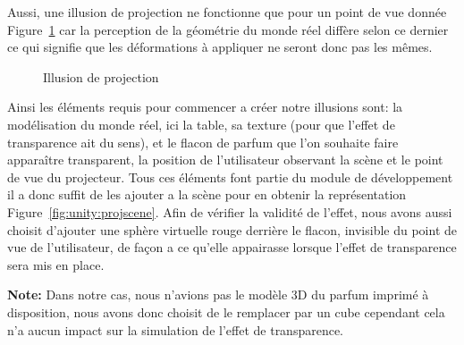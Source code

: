 Aussi, une illusion de projection ne fonctionne que pour un point de vue donnée Figure~\ref{fig:projpov} car la perception de la géométrie du monde réel diffère selon ce dernier ce qui signifie que les déformations à appliquer ne seront donc pas les mêmes.

\begin{figure}[H]
\centering
\caption{Illusion de projection}
\label{fig:projpov}
\end{figure}

Ainsi les éléments requis pour commencer a créer notre illusions sont: la modélisation du monde réel, ici la table, sa texture (pour que l'effet de transparence ait du sens), et le flacon de parfum que l'on souhaite faire apparaître transparent, la position de l'utilisateur observant la scène et le point de vue du projecteur. Tous ces éléments font partie du module de développement il a donc suffit de les ajouter a la scène pour en obtenir la représentation Figure~\ref{fig:unity:projscene}.
Afin de vérifier la validité de l'effet, nous avons aussi choisit d'ajouter une sphère virtuelle rouge derrière le flacon, invisible du point de vue de l'utilisateur, de façon a ce qu'elle appairasse lorsque l'effet de transparence sera mis en place.

\textbf{Note:} Dans notre cas, nous n'avions pas le modèle 3D du parfum imprimé à disposition, nous avons donc choisit de le remplacer par un cube cependant cela n'a aucun impact sur la simulation de l'effet de transparence.

